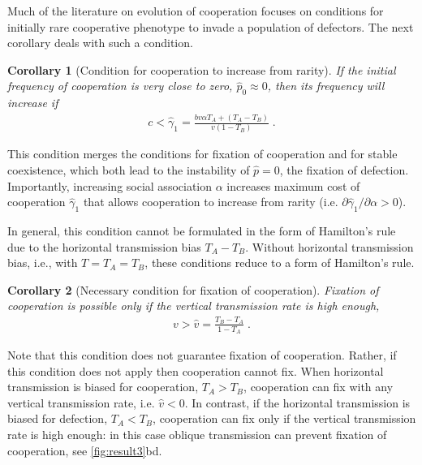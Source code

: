 \documentclass[12pt]{extarticle}
\newtheorem{corollary}{Corollary}
\begin{document}
{Much of the literature on evolution of cooperation focuses on conditions for  initially rare cooperative phenotype to invade a population of defectors.
The next corollary deals with such a condition.
\\

\begin{corollary}[Condition for cooperation to increase from rarity]
  If the initial frequency of cooperation is very close to zero, $\hat{p}_0 \approx 0$, then its frequency will increase if 
  \begin{equation} \label{eq:unequal_transmission_from_rarity_general_case}
  \begin{aligned}
  c < \hat\gamma_1 = \frac{b v \alpha T_A + (T_A - T_B)}{v(1-T_B)} \;.
  \end{aligned}
  \end{equation} 
  \end{corollary}

This condition merges the conditions for fixation of cooperation and for stable coexistence, which both lead to the instability of $\hat{p}=0$, the fixation of defection.
Importantly, increasing social association $\alpha$ increases maximum cost of cooperation $\hat\gamma_1$ that allows cooperation to increase from rarity (i.e. $\partial \hat\gamma_1 / \partial \alpha > 0$).

In general, this condition cannot be formulated in the form of Hamilton's rule due to the horizontal transmission bias $T_A-T_B$.
Without horizontal transmission bias, i.e., with $T=T_A=T_B$, these conditions reduce to a form of Hamilton's rule.
\\
\begin{corollary}[Necessary condition for fixation of cooperation]
  Fixation of cooperation is possible only if the vertical transmission rate is high enough,
  \begin{equation} \label{eq:fixation_of_cooperation_vertical_transmission_condition}
    \begin{aligned}
      v>\hat{v} = \frac{T_B - T_A}{1-T_A} \;.
    \end{aligned}
    \end{equation} 
\end{corollary}
Note that this condition does not guarantee fixation of cooperation. Rather, if this condition does not apply then cooperation cannot fix.
When horizontal transmission is biased for cooperation, $T_A>T_B$, cooperation can fix with any vertical transmission rate, i.e. $\hat{v}<0$.
In contrast, if the horizontal transmission is biased for defection, $T_A<T_B$,  cooperation can fix only if the vertical transmission rate is high enough: in this case oblique transmission can prevent fixation of cooperation, see \autoref{fig:result3}bd.
\\

}
\end{document}
